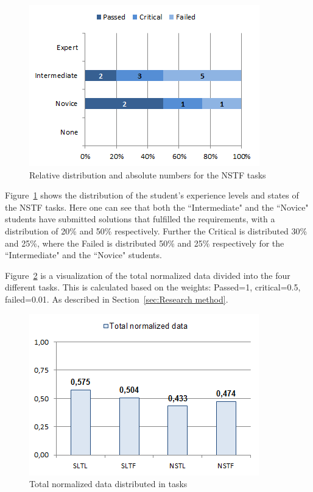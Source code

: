 \documentclass{sig-alternate-05-2015}
\begin{document}
\begin{figure}[!ht]
	\centering
	\includegraphics[width=1\linewidth]{img09}
	\caption{Relative distribution and absolute numbers for the NSTF tasks}
	\label{fig:NSTF percentage distributions with relative task numbers}
\end{figure}

Figure~\ref{fig:NSTF percentage distributions with relative task numbers} shows the distribution of the student's experience levels and states of the NSTF tasks. Here one can see that both the ``Intermediate" and the ``Novice" students have submitted solutions that fulfilled the requirements, with a distribution of 20\% and 50\% respectively. Further the Critical is distributed 30\% and 25\%, where the Failed is distributed 50\% and 25\% respectively for the ``Intermediate" and the ``Novice" students.

Figure~\ref{fig:Total normalized data distributed in tasks} is a visualization of the total normalized data divided into the four different tasks. This is calculated based on the weights: Passed=1, critical=0.5, failed=0.01. As described in Section~\ref{sec:Research method}.

\begin{figure}[!ht]
	\centering
	\includegraphics[width=1\linewidth]{img10}
	\caption{Total normalized data distributed in tasks}
	\label{fig:Total normalized data distributed in tasks}
\end{figure}
\end{document}
